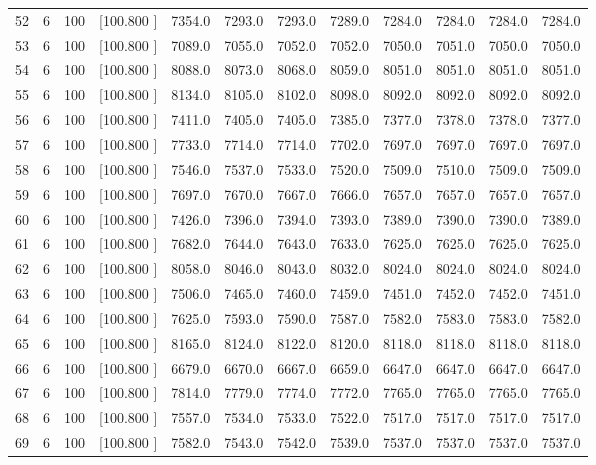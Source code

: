 \documentclass[12pt,a4paper]{article}
\begin{document}
\begin{center}
{\begin{tabular}{r r r r r r r r r r r r}
  52&  6&100&[100.800   ]&  7354.0&  7293.0&  7293.0&  7289.0&  7284.0&  7284.0&  7284.0&  7284.0\\[-0.02in]
  53&  6&100&[100.800   ]&  7089.0&  7055.0&  7052.0&  7052.0&  7050.0&  7051.0&  7050.0&  7050.0\\[-0.02in]
  54&  6&100&[100.800   ]&  8088.0&  8073.0&  8068.0&  8059.0&  8051.0&  8051.0&  8051.0&  8051.0\\[-0.02in]
  55&  6&100&[100.800   ]&  8134.0&  8105.0&  8102.0&  8098.0&  8092.0&  8092.0&  8092.0&  8092.0\\[-0.02in]
  56&  6&100&[100.800   ]&  7411.0&  7405.0&  7405.0&  7385.0&  7377.0&  7378.0&  7378.0&  7377.0\\[-0.02in]
  57&  6&100&[100.800   ]&  7733.0&  7714.0&  7714.0&  7702.0&  7697.0&  7697.0&  7697.0&  7697.0\\[-0.02in]
  58&  6&100&[100.800   ]&  7546.0&  7537.0&  7533.0&  7520.0&  7509.0&  7510.0&  7509.0&  7509.0\\[-0.02in]
  59&  6&100&[100.800   ]&  7697.0&  7670.0&  7667.0&  7666.0&  7657.0&  7657.0&  7657.0&  7657.0\\[-0.02in]
  60&  6&100&[100.800   ]&  7426.0&  7396.0&  7394.0&  7393.0&  7389.0&  7390.0&  7390.0&  7389.0\\[-0.02in]
  61&  6&100&[100.800   ]&  7682.0&  7644.0&  7643.0&  7633.0&  7625.0&  7625.0&  7625.0&  7625.0\\[-0.02in]
  62&  6&100&[100.800   ]&  8058.0&  8046.0&  8043.0&  8032.0&  8024.0&  8024.0&  8024.0&  8024.0\\[-0.02in]
  63&  6&100&[100.800   ]&  7506.0&  7465.0&  7460.0&  7459.0&  7451.0&  7452.0&  7452.0&  7451.0\\[-0.02in]
  64&  6&100&[100.800   ]&  7625.0&  7593.0&  7590.0&  7587.0&  7582.0&  7583.0&  7583.0&  7582.0\\[-0.02in]
  65&  6&100&[100.800   ]&  8165.0&  8124.0&  8122.0&  8120.0&  8118.0&  8118.0&  8118.0&  8118.0\\[-0.02in]
  66&  6&100&[100.800   ]&  6679.0&  6670.0&  6667.0&  6659.0&  6647.0&  6647.0&  6647.0&  6647.0\\[-0.02in]
  67&  6&100&[100.800   ]&  7814.0&  7779.0&  7774.0&  7772.0&  7765.0&  7765.0&  7765.0&  7765.0\\[-0.02in]
  68&  6&100&[100.800   ]&  7557.0&  7534.0&  7533.0&  7522.0&  7517.0&  7517.0&  7517.0&  7517.0\\[-0.02in]
  69&  6&100&[100.800   ]&  7582.0&  7543.0&  7542.0&  7539.0&  7537.0&  7537.0&  7537.0&  7537.0\\[-0.02in]

\end{tabular}}
\end{center}
\end{document}
